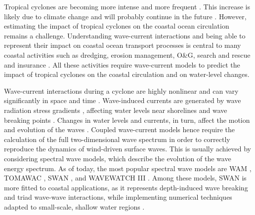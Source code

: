 \documentclass[preprint,12pt,authoryear]{elsarticle}
\begin{document}

Tropical cyclones are becoming more intense and more frequent \citep{bhatia2019recent, kossin2020global}. This increase is likely due to climate change and will probably continue in the future \citep{knutson2020tropical}. However, estimating the impact of tropical cyclones on the coastal ocean circulation remains a challenge. Understanding wave-current interactions and being able to represent their impact on coastal ocean transport processes is central to many coastal activities such as dredging, erosion management, O\&G, search and rescue and insurance \citep{bever2013simulating,li1998three, breivik2013advances}. All these activities require wave-current models to predict the impact of tropical cyclones on the coastal circulation and on water-level changes.

Wave-current interactions during a cyclone are highly nonlinear and can vary significantly in space and time \citep{wu2011fvcom}. Wave-induced currents are generated by wave radiation stress gradients \citep{longuet1970longshore}, affecting water levels near shorelines and wave breaking points \citep{longuet1964radiation}. Changes in water levels and currents, in turn, affect the motion and evolution of the waves \citep{sikiric2013coupling}. Coupled wave-current models hence require the calculation of the full two-dimensional wave spectrum in order to correctly reproduce the dynamics of wind-driven surface waves. This is usually achieved by considering spectral wave models, which describe the evolution of the wave energy spectrum. As of today, the most popular spectral wave models are WAM \citep{group1988wam}, TOMAWAC \citep{benoit1997tomawac}, SWAN \citep{booij1999third}, and WAVEWATCH III \citep{tolman2009user}. Among these models, SWAN is more fitted to coastal applications, as it represents depth-induced wave breaking and triad wave-wave interactions, while implementing numerical techniques adapted to small-scale, shallow water regions \citep{booij1999third}.
\end{document}
